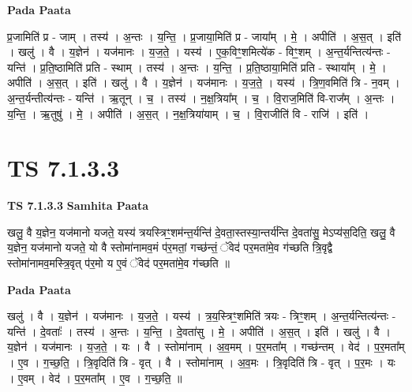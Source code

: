 \documentclass[17pt]{extarticle}
\begin{document}
\textbf{Pada Paata} \newline

प्र॒जामिति॑ प्र - जाम् । तस्य॑ । अ॒न्तः । य॒न्ति॒ । प्र॒जाया॒मिति॑ प्र - जाया᳚म् । मे॒ । अपीति॑ । अ॒स॒त् । इति॑ । खलु॑ । वै । य॒ज्ञेन॑ । यज॑मानः । य॒ज॒ते॒ । यस्य॑ । ए॒क॒विꣳ॒॒शमित्ये॑क - विꣳ॒॒शम् । अ॒न्त॒र्यन्तित्य॑न्तः - यन्ति॑ । प्र॒ति॒ष्ठामिति॑ प्रति - स्थाम् । तस्य॑ । अ॒न्तः । य॒न्ति॒ । प्र॒ति॒ष्ठाया॒मिति॑ प्रति - स्थाया᳚म् । मे॒ । अपीति॑ । अ॒स॒त् । इति॑ । खलु॑ । वै । य॒ज्ञेन॑ । यज॑मानः । य॒ज॒ते॒ । यस्य॑ । त्रि॒ण॒वमिति॑ त्रि - न॒वम् । अ॒न्त॒र्यन्तीत्य॑न्तः - यन्ति॑ । ऋ॒तून् । च॒ । तस्य॑ । न॒क्ष॒त्रिया᳚म् । च॒ । वि॒राज॒मिति॑ वि-राज᳚म् । अ॒न्तः । य॒न्ति॒ । ऋ॒तुषु॑ । मे॒ । अपीति॑ । अ॒स॒त् । न॒क्ष॒त्रिया॑याम् । च॒ । वि॒राजीति॑ वि - राजि॑ । इति॑ ।  \newline




\section*{ TS 7.1.3.3 }

\textbf{TS 7.1.3.3 } \newline
\textbf{Samhita Paata} \newline

खलु॒ वै य॒ज्ञेन॒ यज॑मानो यजते॒ यस्य॑ त्रयस्त्रिꣳ॒॒शम॑न्त॒र्यन्ति॑ दे॒वता॒स्तस्या॒न्तर्य॑न्ति दे॒वता॑सु॒ मेऽप्य॑स॒दिति॒ खलु॒ वै य॒ज्ञेन॒ यज॑मानो यजते॒ यो वै स्तोमा॑नामव॒मं प॑र॒मतां॒ गच्छ॑न्तं॒ ॅवेद॑ पर॒मता॑मे॒व ग॑च्छति त्रि॒वृद्वै स्तोमा॑नामव॒मस्त्रि॒वृत् प॑र॒मो य ए॒वं ॅवेद॑ पर॒मता॑मे॒व ग॑च्छति ॥ \newline

\textbf{Pada Paata} \newline

खलु॑ । वै । य॒ज्ञेन॑ । यज॑मानः । य॒ज॒ते॒ । यस्य॑ । त्र॒य॒स्त्रिꣳ॒॒शमिति॑ त्रयः - त्रिꣳ॒॒शम् । अ॒न्त॒र्यन्तित्य॑न्तः - यन्ति॑ । दे॒वताः᳚ । तस्य॑ । अ॒न्तः । य॒न्ति॒ । दे॒वता॑सु । मे॒ । अपीति॑ । अ॒स॒त् । इति॑ । खलु॑ । वै । य॒ज्ञेन॑ । यज॑मानः । य॒ज॒ते॒ । यः । वै । स्तोमा॑नाम् । अ॒व॒मम् । प॒र॒मता᳚म् । गच्छ॑न्तम् । वेद॑ । प॒र॒मता᳚म् । ए॒व । ग॒च्छ॒ति॒ । त्रि॒वृदिति॑ त्रि - वृत् । वै । स्तोमा॑नाम् । अ॒व॒मः । त्रि॒वृदिति॑ त्रि - वृत् । प॒र॒मः । यः । ए॒वम् । वेद॑ । प॒र॒मता᳚म् । ए॒व । ग॒च्छ॒ति॒ ॥  \newline




\end{document}

